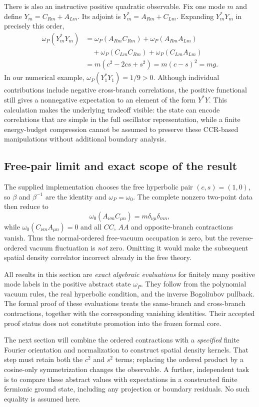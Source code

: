There is also an instructive positive quadratic observable. Fix one
mode $m$ and define $Y_m=C_{Rm}+A_{Lm}$. Its adjoint is
$Y_m^*=A_{Rm}+C_{Lm}$. Expanding $Y_m^*Y_m$ in precisely this order,
\begin{align*}
 \omega_P(Y_m^*Y_m)
 &=\omega_P(A_{Rm}C_{Rm})
   +\omega_P(A_{Rm}A_{Lm})\\
 &\quad+\omega_P(C_{Lm}C_{Rm})
   +\omega_P(C_{Lm}A_{Lm})\\
 &=m(c^2-2cs+s^2)=m(c-s)^2=mg.
\end{align*}
In our numerical example, $\omega_P(Y_1^*Y_1)=1/9>0$.
Although individual contributions include negative cross-branch
correlations, the positive functional still gives a nonnegative
expectation to an element of the form $Y^*Y$. This calculation makes
the underlying tradeoff visible: the state can encode correlations
that are simple in the full oscillator representation, while a
finite energy-budget compression cannot be assumed to preserve these
CCR-based manipulations without additional boundary analysis.

\subsection{Free-pair limit and exact scope of the result}

The supplied implementation chooses the free hyperbolic pair
$(c,s)=(1,0)$, so $\beta$ and $\beta^{-1}$ are the identity and
$\omega_P=\omega_0$. The complete nonzero two-point data then reduce
to
\begin{equation}
 \omega_0(A_{\nu m}C_{\mu n})
 =m\delta_{\nu\mu}\delta_{mn},
 \label{eq:ch19-mode-free-limit}
\end{equation}
while $\omega_0(C_{\nu m}A_{\mu n})=0$ and all $CC$, $AA$
and opposite-branch contractions vanish. Thus the normal-ordered
free-vacuum occupation is zero, but the reverse-ordered vacuum
fluctuation is \emph{not} zero. Omitting it would make the subsequent
spatial density correlator incorrect already in the free theory.

All results in this section are \emph{exact algebraic evaluations} for
finitely many positive mode labels in the positive abstract state
$\omega_P$. They follow from the polynomial vacuum rules, the real
hyperbolic condition, and the inverse Bogoliubov pullback. The formal proof of these evaluations treats the same-branch and
cross-branch contractions, together with the corresponding vanishing
identities. Their accepted proof status does not constitute promotion into
the frozen formal core.

The next section will combine the ordered contractions with a
\emph{specified} finite Fourier orientation and normalization to
construct spatial density kernels. That step must retain both the
$c^2$ and $s^2$ terms; replacing the ordered product by a cosine-only
symmetrization changes the observable. A further, independent task is
to compare these abstract values with expectations in a constructed
finite fermionic ground state, including any projection or boundary
residuals. No such equality is assumed here.
